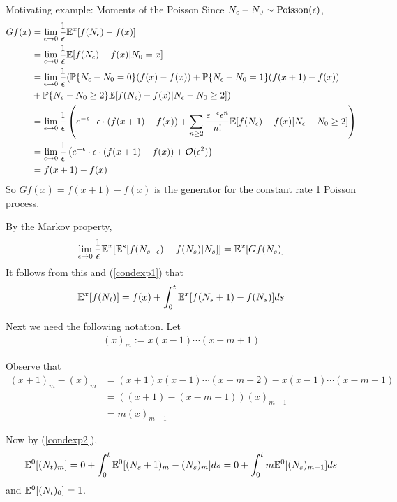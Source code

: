 \documentclass[classnotes]{fillsntsx}
\begin{document}
\begin{exmp}{Motivating example: Moments of the Poisson}
Since $N_\epsilon - N_0 \sim \operatorname{Poisson}(\epsilon)$, 
$$\begin{aligned}
Gf(x) &= \lim_{\epsilon \to 0} \frac{1}{\epsilon} \mathbb{E}^{x} [f(N_\epsilon) - f(x)] \\
& =   \lim_{\epsilon \to 0} \frac{1}{\epsilon} \mathbb{E}[f(N_\epsilon) - f(x) | N_0 = x] \\
& =   \lim_{\epsilon \to 0}  \frac{1}{\epsilon} ( \mathbb{P} \{ N_\epsilon - N_0 = 0 \} ( f(x) - f(x) ) +
\mathbb{P} \{ N_\epsilon - N_0 = 1 \} ( f(x+1) - f(x) )  \\
 & + \mathbb{P} \{ N_\epsilon - N_0 \geq 2 \} \mathbb{E}[f(N_\epsilon) - f(x) | N_\epsilon - N_0 \geq 2 ] )\\
& =   \lim_{\epsilon \to 0}  \frac{1}{\epsilon}  \left( e^{-\epsilon} \cdot \epsilon \cdot (f(x+1) - f(x)) + \sum_{n \geq 2} \dfrac{e^{-\epsilon} \epsilon^n}{n!}\mathbb{E}[f(N_\epsilon) - f(x) | N_\epsilon - N_0 \geq 2 ]  \right) \\
& =   \lim_{\epsilon \to 0}  \frac{1}{\epsilon}  \left( e^{-\epsilon} \cdot \epsilon \cdot (f(x+1) - f(x)) + \mathcal{O}(\epsilon^2) \right) \\
& =  f(x+1) - f(x)
 \end{aligned}$$
 So $Gf(x) = f(x + 1) - f(x)$ is the generator for the constant rate 1 Poisson process. 
 
 By the Markov property, 
$$\begin{aligned}
 \lim_{\epsilon \to 0}   \frac{1}{\epsilon} \mathbb{E}^x [ \mathbb{E}^s [f(N_{s+\epsilon}) - f(N_s) | N_s] ] =  \mathbb{E}^x[Gf(N_s)]
 \end{aligned}$$
It follows from this and (\ref{condexp1}) that
 \begin{align}
 \label{condexp2}
 \mathbb{E}^x[f(N_t)] = f(x) + \int_0^t \mathbb{E}^x [f(N_s + 1) - f(N_s) ] ds
 \end{align}
 
Next we need the following notation. Let 
$$\begin{aligned}
(x)_m := x(x-1) \cdots (x-m+1)
\end{aligned}$$

Observe that 
$$\begin{aligned}
(x+1)_m - (x)_m &= (x+1) x (x-1) \cdots (x-m+2) - x (x-1) \cdots (x-m+1)\\
& = ( (x+1) - (x-m+1) ) (x)_{m-1} \\
&= m(x)_{m-1}
\end{aligned}$$

Now by (\ref{condexp2}),
$$\begin{aligned}
\mathbb{E}^0 [ (N_t)_m ] =0 + \int_0^{t}  \mathbb{E}^{0} [(N_s+1)_m - (N_s)_{m}] ds = 0 + \int_0^{t} m \mathbb{E}^{0} [(N_s)_{m-1}] ds 
\end{aligned}$$
and $\mathbb{E}^0 [ (N_t)_0 ] = 1$. 


\end{exmp}
\end{document}

